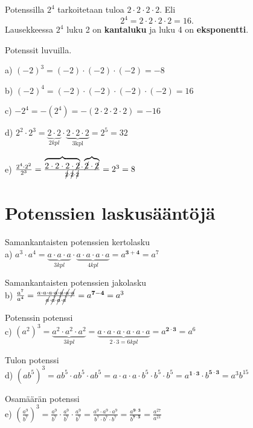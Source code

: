 Potenssilla $2^4$ tarkoitetaan tuloa $2\cdot 2\cdot 2\cdot 2$. Eli
\begin{equation*}
2^4=2\cdot 2\cdot 2\cdot 2=16.
\end{equation*}
Lausekkeessa $2^4$ luku 2 on \textbf{kantaluku} ja luku 4 on \textbf{eksponentti}.

\begin{esimerkki}
Potenssit luvuilla.

a) $(-2)^3=(-2)\cdot (-2)\cdot (-2)=-8$

b) $(-2)^4=(-2)\cdot (-2)\cdot (-2)\cdot (-2)=16$

c) $-2^4=-(2^4)=-(2\cdot 2\cdot 2\cdot 2)=-16$

d) $2^2\cdot 2^3=\underbrace{2\cdot 2}_{2 kpl}\cdot \underbrace{2\cdot 2\cdot 2}_{3 \text{kpl}}=2^5=32$

e) $\frac{2^4\cdot 2^2}{2^3}=\frac{\overbrace{2\cdot 2\cdot 2\cdot \cancel{2}}\cdot \overbrace{\cancel{2}\cdot \cancel{2}}}{\cancel{2}\cdot \cancel{2}\cdot \cancel{2}}=2^3=8$
\end{esimerkki}

\section*{Potenssien laskusääntöjä}

Samankantaisten potenssien kertolasku\\
a) $a^3\cdot a^4=\underbrace{a\cdot a\cdot a}_{3 kpl}\cdot \underbrace{a\cdot a\cdot a\cdot a}_{4 kpl}=a^{\mathbf{3+4}}=a^7$

Samankantaisten potenssien jakolasku\\
b) $\frac{a^7}{a^4}=\frac{a\cdot a\cdot a\cdot \cancel{a}\cdot \cancel{a}\cdot \cancel{a}\cdot \cancel{a}}{\cancel{a}\cdot \cancel{a}\cdot \cancel{a}\cdot \cancel{a}}=a^{\mathbf{7-4}}=a^3$

Potenssin potenssi\\
c) $(a^2)^3=\underbrace{a^2\cdot a^2\cdot a^2}_{3 kpl}=\underbrace{a\cdot a\cdot a\cdot a\cdot a\cdot a}_{2\cdot 3=6 kpl}=a^{\mathbf{2\cdot 3}}=a^6$

Tulon potenssi\\
d) $(ab^5)^3=ab^5\cdot ab^5\cdot ab^5=a\cdot a\cdot a\cdot b^5\cdot b^5\cdot b^5=a^{\mathbf{1\cdot 3}}\cdot b^{\mathbf{5\cdot 3}}=a^3b^{15}$

Osamäärän potenssi\\
e) $\left(\frac{a^9}{b^7}\right)^3=\frac{a^9}{b^7}\cdot \frac{a^9}{b^7}\cdot \frac{a^9}{b^7}=\frac{a^9\cdot a^9\cdot a^9}{b^7\cdot b^7\cdot b^7}=\frac{a^{\mathbf{9\cdot 3}}}{b^{\mathbf{7\cdot 3}}}=\frac{a^{27}}{a^{21}}$

